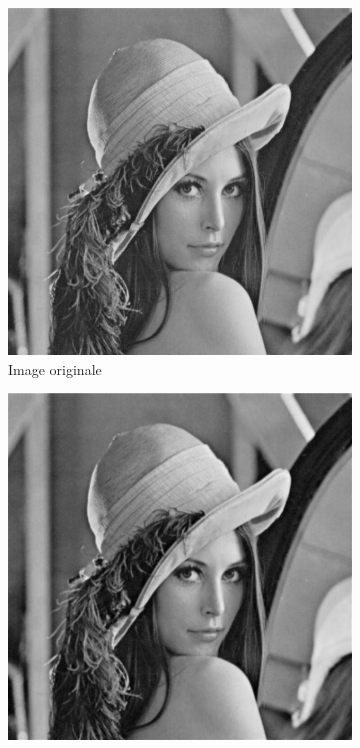 \documentclass[hidelinks,11pt]{article}
\theoremstyle{mytheoremstyle}
\theoremstyle{mytheoremstyle}
\theoremstyle{myproblemstyle}
\begin{document}
    \begin{figure}
        \centering
        \begin{subfigure}[b]{0.3\textwidth}
            \centering
            \includegraphics[width=\textwidth]{figs/fig6a}
            \caption{Image originale}
        \end{subfigure}
        \hfill
        \begin{subfigure}[b]{0.3\textwidth}
            \centering
            \includegraphics[width=\textwidth]{figs/fig6b}

\end{subfigure}
\end{figure}
\end{document}
